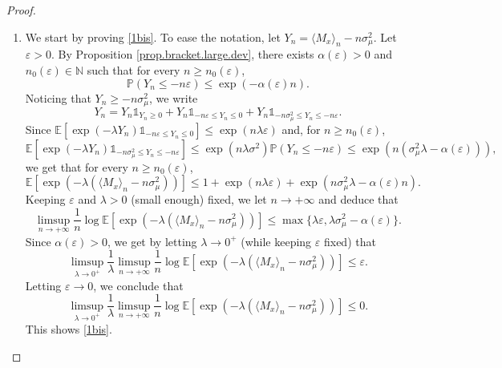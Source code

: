 \documentclass[JEP,XML,SOM,Unicode,published]{cedram}
\newenvironment{enumeratei}
{\bgroup\def\theenumi{\roman{enumi}}\def\theenumii{\arabic{enumii}}\begin{enumerate}}
{\end{enumerate}\egroup}
\let\epsilon\varepsilon
\theoremstyle{plain}
\theoremstyle{definition}
\newcommand\E{\mathbb{E}}
\newcommand\p{\mathbb{P}}
\newcommand\N{\mathbb{N}}
\begin{document}
\begin{proof}
\begin{enumeratei}
\item
We start by proving \eqref{1bis}.
To ease the notation, let $Y_n=\langle M_x\rangle_n-n\sigma_{\mu}^2$. Let $\epsilon>0$. By Proposition \ref{prop.bracket.large.dev}, there exists $\alpha(\epsilon)>0$ and $n_0(\epsilon)\in \N$ such that for every $n\geq n_0(\epsilon)$,
\[
\p(Y_n\leq -n\epsilon)\leq \exp(-\alpha(\epsilon) n).
\]
Noticing that $Y_n\geq - n\sigma^2_\mu$, we write
\[
Y_n=Y_n\mathds{1}_{Y_n\geq 0}+
Y_n\mathds{1}_{-n\epsilon \leq Y_n\leq 0}
+ Y_n\mathds{1}_{-n\sigma^2_\mu \leq Y_n\leq -n\epsilon}.
\]
Since $\E[\exp(-\lambda Y_n) \mathds{1}_{-n\epsilon \leq Y_n\leq 0}]\leq \exp(n\lambda \epsilon)$ and, for $n\geq n_0(\epsilon)$,
\[
\E[\exp(-\lambda Y_n)\mathds{1}_{-n\sigma_\mu^2 \leq Y_n\leq -n\epsilon}]\leq \exp(n\lambda \sigma^2)\p(Y_n\leq -n\epsilon)\leq \exp(n (\sigma_\mu^2\lambda-\alpha(\epsilon))),
\]
we get that for every $n\geq n_0(\epsilon)$,
\[
\E[\exp(-\lambda(\langle M_x\rangle_n - n\sigma_\mu^2))]\leq 1+ \exp(n\lambda \epsilon)+\exp(n\sigma_\mu^2 \lambda-\alpha(\epsilon)n).
\]
Keeping $\epsilon$ and $\lambda>0$ (small enough) fixed, we let $n\to +\infty$ and deduce that
\[
\limsup_{n\to +\infty}
\frac{1}{n}\log \E[\exp(-\lambda(\langle M_x\rangle_n - n\sigma_\mu^2))]\leq \max\{\lambda \epsilon, \lambda \sigma_\mu^2-\alpha(\epsilon)\}.
\]
Since $\alpha(\epsilon)>0$, we get by letting $\lambda\to 0^+$ (while keeping $
\epsilon$ fixed) that
\[
\limsup_{\lambda\to 0^+}\frac{1}{\lambda}\limsup_{n\to +\infty}
\frac{1}{n}\log \E[\exp(-\lambda(\langle M_x\rangle_n - n\sigma_\mu^2))]\leq \epsilon.
\]
Letting $\epsilon\to 0$, we conclude that
\[
\limsup_{\lambda\to 0^+}\frac{1}{\lambda}\limsup_{n\to +\infty}
\frac{1}{n}\log \E[\exp(-\lambda(\langle M_x\rangle_n - n\sigma_\mu^2))]\leq 0.
\]
This shows \eqref{1bis}.


\end{enumeratei}
\end{proof}
\end{document}
